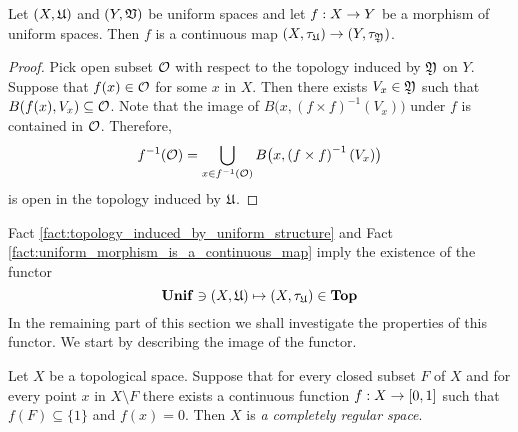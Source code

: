 \begin{fact}\label{fact:uniform_morphism_is_a_continuous_map}
Let $(X,{\mathfrak U})$ and $(Y,{\mathfrak V})$ be uniform spaces and let $f:X\rightarrow Y$ be a morphism of uniform spaces. Then $f$ is a continuous map $\left(X,\tau_{{\mathfrak U}}\right)\rightarrow \left(Y,\tau_{{\mathfrak Y}}\right)$.
\end{fact}
\begin{proof}
Pick open subset ${\mathcal O}$ with respect to the topology induced by ${\mathfrak Y}$ on $Y$. Suppose that $f(x) \in {\mathcal O}$ for some $x$ in $X$. Then there exists $V_x \in {\mathfrak Y}$ such that $B(f(x),V_x)\subseteq {\mathcal O}$. Note that the image of $B\big(x,\left(f\times f\right)^{-1}(V_x)\big)$ under $f$ is contained in ${\mathcal O}$. Therefore,
$$f^{-1}({\mathcal O}) = \bigcup_{x\in f^{-1}({\mathcal O})}B\big(x,\left(f\times f\right)^{-1}(V_x)\big)$$
is open in the topology induced by ${\mathfrak U}$.
\end{proof}
\noindent
Fact \ref{fact:topology_induced_by_uniform_structure} and Fact \ref{fact:uniform_morphism_is_a_continuous_map} imply the existence of the functor 
$$\mathbf{Unif} \ni (X,{\mathfrak U}) \mapsto (X,\tau_{{\mathfrak U}})\in   \mathbf{Top}$$
In the remaining part of this section we shall investigate the properties of this functor. We start by describing the image of the functor.

\begin{definition}
Let $X$ be a topological space. Suppose that for every closed subset $F$ of $X$ and for every point $x$ in $X\setminus  F$ there exists a continuous function $f:X\rightarrow [0,1]$ such that $f(F) \subseteq \{1\}$ and $f(x) = 0$. Then $X$ is \textit{a completely regular space}. 
\end{definition}

